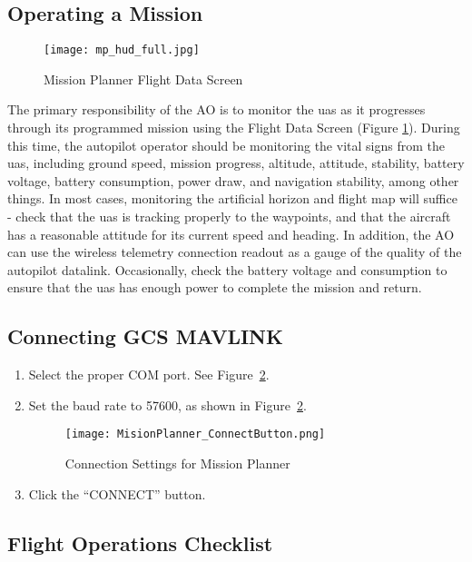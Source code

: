 \documentclass{report}
\begin{document}
	\section{Operating a Mission}
		\begin{figure}[ht]
			\centering
			\caption{Mission Planner Flight Data Screen}
			\texttt{[image: mp\_hud\_full.jpg]}
			\label{fig:mp_flt_data}
		\end{figure}
		The primary responsibility of the \gls{AO} is to monitor the \gls{uas} as it progresses through its programmed mission using the Flight Data Screen (Figure \ref{fig:mp_flt_data}).  During this time, the autopilot operator should be monitoring the vital signs from the \gls{uas}, including ground speed, mission progress, altitude, attitude, stability, battery voltage, battery consumption, power draw, and navigation stability, among other things.  In most cases, monitoring the artificial horizon and flight map will suffice - check that the \gls{uas} is tracking properly to the waypoints, and that the aircraft has a reasonable attitude for its current speed and heading.  In addition, the \gls{AO} can use the wireless telemetry connection readout as a gauge of the quality of the autopilot datalink.  Occasionally, check the battery voltage and consumption to ensure that the \gls{uas} has enough power to complete the mission and return.
	\section{Connecting GCS MAVLINK}
		\begin{enumerate}
			\item Select the proper COM port.  See Figure~\ref{fig:MP_Connect}.
			\item Set the baud rate to 57600, as shown in Figure~\ref{fig:MP_Connect}.
				\begin{figure}[ht]
					\centering
					\caption{Connection Settings for Mission Planner}
					\texttt{[image: MisionPlanner\_ConnectButton.png]}
					\label{fig:MP_Connect}
				\end{figure}
			\item Click the ``CONNECT'' button.
		\end{enumerate}
	\begin{appendices}
		\chapter{Flight Operations Checklist}
	\end{appendices}
\printglossaries
\end{document}

